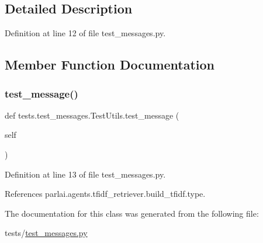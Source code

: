 \subsection{Detailed Description}


Definition at line 12 of file test\+\_\+messages.\+py.



\subsection{Member Function Documentation}
\mbox{\label{classtests_1_1test__messages_1_1TestUtils_ab43cf75c46098c2d2bd7ee061c93be96}} 
\subsubsection{\texorpdfstring{test\+\_\+message()}{test\_message()}}
{\footnotesize\ttfamily def tests.\+test\+\_\+messages.\+Test\+Utils.\+test\+\_\+message (\begin{DoxyParamCaption}\item[{}]{self }\end{DoxyParamCaption})}



Definition at line 13 of file test\+\_\+messages.\+py.



References parlai.\+agents.\+tfidf\+\_\+retriever.\+build\+\_\+tfidf.\+type.



The documentation for this class was generated from the following file\+:\begin{DoxyCompactItemize}
\item 
tests/\hyperlink{test__messages_8py}{test\+\_\+messages.\+py}\end{DoxyCompactItemize}
